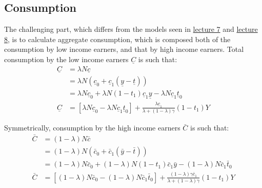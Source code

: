 \documentclass[]{book}
\theoremstyle{definition}
\theoremstyle{definition}
\theoremstyle{definition}
\theoremstyle{remark}
\begin{document}
\subsection{Consumption}\label{consumption}

The challenging part, which differs from the models seen in
\protect\hyperlink{cons-function}{lecture 7} and
\protect\hyperlink{paradox-thrift}{lecture 8}, is to calculate aggregate
consumption, which is composed both of the consumption by low income
earners, and that by high income earners. Total consumption by the low
income earners \(\underline{C}\) is such that: \[
\begin{aligned}
\underline{C}&=\lambda N \underline{c}\\
&=\lambda N \left(\underline{c}_{0}+\underline{c}_{1}(\underline{y}-\underline{t})\right)\\
&=\lambda N  \underline{c}_{0} + \lambda N  (1-t_1) \underline{c}_{1}\underline{y}-\lambda N  \underline{c}_{1} \underline{t}_0\\
\underline{C}&=\left[\lambda N  \underline{c}_{0}-\lambda  N \underline{c}_{1} \underline{t}_0 \right]+ \frac{\lambda \underline{c}_{1}}{\lambda+(1-\lambda)\gamma}(1-t_1)Y
\end{aligned}
\]

Symmetrically, consumption by the high income earners \(\bar{C}\) is
such that: \[
\begin{aligned}
\bar{C}&=(1-\lambda) N \bar{c}\\
&=(1-\lambda) N \left(\bar{c}_{0}+\bar{c}_{1}(\bar{y}-\bar{t})\right)\\
&=(1-\lambda) N  \bar{c}_{0} + (1-\lambda) N (1-t_1) \bar{c}_{1}\bar{y}-(1-\lambda) N  \bar{c}_{1} \bar{t}_0\\
\bar{C}&=\left[(1-\lambda) N  \bar{c}_{0}-(1-\lambda) N  \bar{c}_{1} \bar{t}_0\right] + \frac{(1-\lambda) \gamma\bar{c}_{1}}{\lambda+(1-\lambda)\gamma}(1-t_1)Y
\end{aligned}
\]
\end{document}
